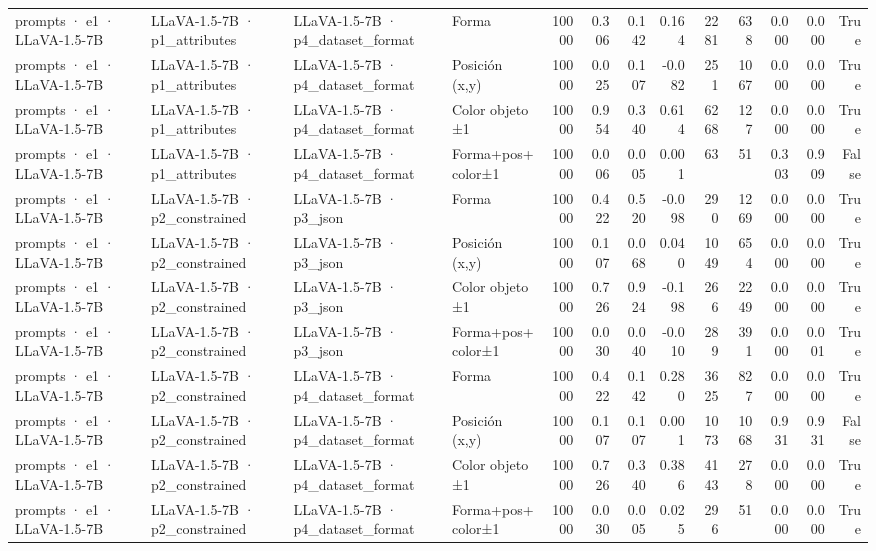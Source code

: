 \begin{tabular}{llllrrrrrrrrr}
prompts · e1 · LLaVA-1.5-7B & LLaVA-1.5-7B · p1\_attributes & LLaVA-1.5-7B · p4\_dataset\_format & Forma & 10000 & 0.306 & 0.142 & 0.164 & 2281 & 638 & 0.000 & 0.000 & True \\
prompts · e1 · LLaVA-1.5-7B & LLaVA-1.5-7B · p1\_attributes & LLaVA-1.5-7B · p4\_dataset\_format & Posición (x,y) & 10000 & 0.025 & 0.107 & -0.082 & 251 & 1067 & 0.000 & 0.000 & True \\
prompts · e1 · LLaVA-1.5-7B & LLaVA-1.5-7B · p1\_attributes & LLaVA-1.5-7B · p4\_dataset\_format & Color objeto ±1 & 10000 & 0.954 & 0.340 & 0.614 & 6268 & 127 & 0.000 & 0.000 & True \\
prompts · e1 · LLaVA-1.5-7B & LLaVA-1.5-7B · p1\_attributes & LLaVA-1.5-7B · p4\_dataset\_format & Forma+pos+color±1 & 10000 & 0.006 & 0.005 & 0.001 & 63 & 51 & 0.303 & 0.909 & False \\
prompts · e1 · LLaVA-1.5-7B & LLaVA-1.5-7B · p2\_constrained & LLaVA-1.5-7B · p3\_json & Forma & 10000 & 0.422 & 0.520 & -0.098 & 290 & 1269 & 0.000 & 0.000 & True \\
prompts · e1 · LLaVA-1.5-7B & LLaVA-1.5-7B · p2\_constrained & LLaVA-1.5-7B · p3\_json & Posición (x,y) & 10000 & 0.107 & 0.068 & 0.040 & 1049 & 654 & 0.000 & 0.000 & True \\
prompts · e1 · LLaVA-1.5-7B & LLaVA-1.5-7B · p2\_constrained & LLaVA-1.5-7B · p3\_json & Color objeto ±1 & 10000 & 0.726 & 0.924 & -0.198 & 266 & 2249 & 0.000 & 0.000 & True \\
prompts · e1 · LLaVA-1.5-7B & LLaVA-1.5-7B · p2\_constrained & LLaVA-1.5-7B · p3\_json & Forma+pos+color±1 & 10000 & 0.030 & 0.040 & -0.010 & 289 & 391 & 0.000 & 0.001 & True \\
prompts · e1 · LLaVA-1.5-7B & LLaVA-1.5-7B · p2\_constrained & LLaVA-1.5-7B · p4\_dataset\_format & Forma & 10000 & 0.422 & 0.142 & 0.280 & 3625 & 827 & 0.000 & 0.000 & True \\
prompts · e1 · LLaVA-1.5-7B & LLaVA-1.5-7B · p2\_constrained & LLaVA-1.5-7B · p4\_dataset\_format & Posición (x,y) & 10000 & 0.107 & 0.107 & 0.001 & 1073 & 1068 & 0.931 & 0.931 & False \\
prompts · e1 · LLaVA-1.5-7B & LLaVA-1.5-7B · p2\_constrained & LLaVA-1.5-7B · p4\_dataset\_format & Color objeto ±1 & 10000 & 0.726 & 0.340 & 0.386 & 4143 & 278 & 0.000 & 0.000 & True \\
prompts · e1 · LLaVA-1.5-7B & LLaVA-1.5-7B · p2\_constrained & LLaVA-1.5-7B · p4\_dataset\_format & Forma+pos+color±1 & 10000 & 0.030 & 0.005 & 0.025 & 296 & 51 & 0.000 & 0.000 & True \\

\end{tabular}

